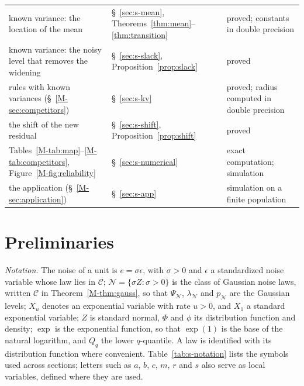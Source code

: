 \documentclass[12pt]{article}
\renewcommand{\_}{\usc\allowbreak}
\theoremstyle{definition}
\numberwithin{equation}{section}
\newcommand{\E}{\mathcal{C}}
\newcommand{\N}{\mathcal{N}}
\begin{document}
\begin{table}[!h]
\begin{tabular}{p{4.9cm}p{3.2cm}p{3.8cm}}
known variance: the location of the mean & \S~\ref{sec:s-mean}, Theorems~\ref{thm:mean}--\ref{thm:transition} & proved; constants in double precision \\
known variance: the noisy level that removes the widening & \S~\ref{sec:s-slack}, Proposition~\ref{prop:slack} & proved \\
rules with known variances (\S~\ref{M-sec:competitors}) & \S~\ref{sec:s-kv} & proved; radius computed in double precision \\
the shift of the new residual & \S~\ref{sec:s-shift}, Proposition~\ref{prop:shift} & proved \\
Tables~\ref{M-tab:map}--\ref{M-tab:competitors}, Figure~\ref{M-fig:reliability} & \S~\ref{sec:s-numerical} & exact computation; simulation \\
the application (\S~\ref{M-sec:application}) & \S~\ref{sec:s-app} & simulation on a finite population \\
\bottomrule
\end{tabular}
\end{table}

\section{Preliminaries}\label{sec:s-prelim}

\emph{Notation.} The noise of a unit is $e = \sigma\epsilon$, with $\sigma > 0$ and $\epsilon$ a standardized noise variable whose law lies in $\E$; $\N = \{\sigma Z : \sigma > 0\}$ is the class of Gaussian noise laws, written $\E$ in Theorem~\ref{M-thm:gauss}, so that $\Psi_{\N}$, $\lambda_{\N}$ and $p_{\N}$ are the Gaussian levels; $X_u$ denotes an exponential variable with rate $u > 0$, and $X_1$ a standard exponential variable; $Z$ is standard normal, $\Phi$ and $\phi$ its distribution function and density; $\exp$ is the exponential function, so that $\exp(1)$ is the base of the natural logarithm, and $Q_q$ the lower $q$-quantile. A law is identified with its distribution function where convenient. Table~\ref{tab:s-notation} lists the symbols used across sections; letters such as $a$, $b$, $c$, $m$, $r$ and $s$ also serve as local variables, defined where they are used.
\end{document}
